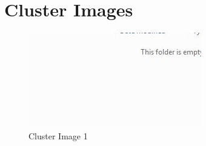 \chapter{Cluster Images}
\label{APP_CI}
\begin{figure}[!ht]
  \centering
    \includegraphics[width=\textwidth]{Appendix/Images/Clusters/Temp_Cluster_Image}
  \caption{Cluster Image 1}
  \label{fig:APP_CI_CI1}
\end{figure}